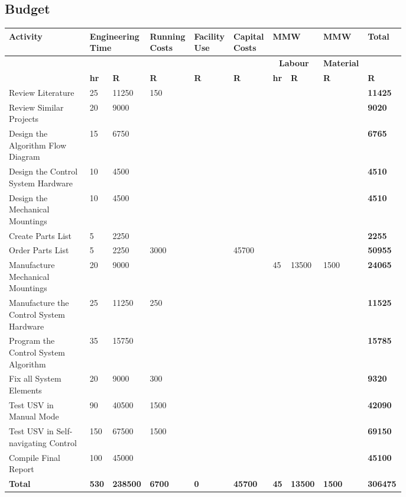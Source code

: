 \begin{landscape}
	\small
\section{Budget}
\begin{tabular}{|p{0.2\linewidth}|p{0.03\linewidth}|p{0.06\linewidth}|p{0.08\linewidth}|p{0.08\linewidth}|p{0.08\linewidth}|p{0.03\linewidth}|p{0.06\linewidth}|p{0.08\linewidth}|p{0.08\linewidth}|}
	\hline
	\textbf{Activity} & \multicolumn{2}{p{0.09\linewidth}|}{\textbf{Engineering Time}} & \textbf{Running Costs} & \textbf{Facility Use} & \textbf{Capital Costs} & \multicolumn{2}{p{0.09\linewidth}|}{\textbf{MMW}} & \textbf{MMW} & \textbf{Total} \\
	\hline
	&  &  &  &  &  & \multicolumn{2}{c|}{\textbf{Labour}} & \textbf{Material} &  \\
	\hline
	& \textbf{hr} & \textbf{R} & \textbf{R} & \textbf{R} & \textbf{R} & \textbf{hr} & \textbf{R} & \textbf{R} & \textbf{R} \\
	\hline
	Review Literature & 25 & 11250 & 150 &   &   &   &   &   & \textbf{11425} \\
	\hline
	Review Similar Projects & 20 & 9000 &   &   &   &   &   &   & \textbf{9020 }\\
	\hline
	Design the Algorithm Flow Diagram & 15 & 6750 &   &   &   &   &   &   & \textbf{6765 }\\
	\hline
	Design the Control System Hardware & 10 & 4500 &   &   &   &   &   &   & \textbf{4510}\\
	\hline
	Design the Mechanical Mountings & 10 & 4500 &   &   &   &   &   &   & \textbf{4510 }\\
	\hline
	Create Parts List & 5 & 2250 &   &   &   &   &   &   & \textbf{2255 }\\
	\hline
	Order Parts List & 5 & 2250 & 3000 &   & 45700 &   &   &   & \textbf{50955 }\\
	\hline
	Manufacture Mechanical Mountings & 20 & 9000 &   &   &   & 45 & 13500 & 1500 & \textbf{24065} \\
	\hline
	Manufacture the Control System Hardware & 25 & 11250 & 250 &   &   &   &   &   & \textbf{11525} \\
	\hline
	Program the Control System Algorithm & 35 & 15750 &   &   &   &   &   &   & \textbf{15785 }\\
	\hline
	Fix all System Elements & 20 & 9000 & 300 &   &   &   &   &   & \textbf{9320 }\\
	\hline
	Test USV in Manual Mode & 90 & 40500 & 1500 &   &   &   &   &   & \textbf{42090 }\\
	\hline
	Test USV in Self-navigating Control & 150 & 67500 & 1500 &   &   &   &   &   & \textbf{69150 }\\
	\hline
	Compile Final Report & 100 & 45000 &   &   &   &   &   &   & \textbf{45100 }\\
	\hline
	\textbf{Total} & \textbf{530} & \textbf{238500} & \textbf{6700} & \textbf{0} & \textbf{45700} & \textbf{45} & \textbf{13500} & \textbf{1500} & \textbf{306475} \\
	\hline
\end{tabular}


\end{landscape}
